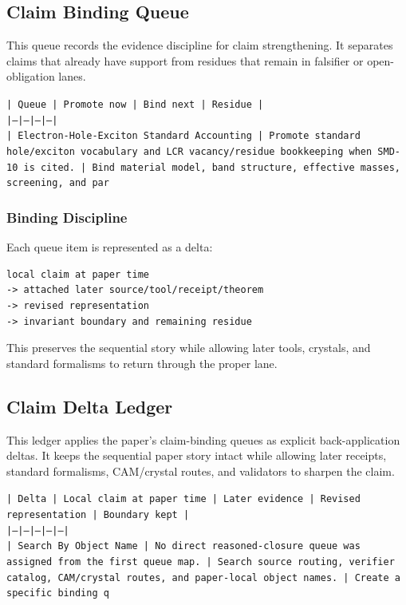 \documentclass[11pt]{article}
\begin{document}
\subsection*{Claim Binding Queue}

This queue records the evidence discipline for claim strengthening. It separates claims that already have support from residues that remain in falsifier or open-obligation lanes.

\noindent\texttt{| Queue | Promote now | Bind next | Residue |}\\
\noindent\texttt{|---|---|---|---|}\\
\noindent\texttt{| Electron-Hole-Exciton Standard Accounting | Promote standard hole/exciton vocabulary and LCR vacancy/residue bookkeeping when SMD-10 is cited. | Bind material model, band structure, effective masses, screening, and par}\\

\subsubsection*{Binding Discipline}

Each queue item is represented as a delta:

\begin{verbatim}
local claim at paper time
-> attached later source/tool/receipt/theorem
-> revised representation
-> invariant boundary and remaining residue
\end{verbatim}

This preserves the sequential story while allowing later tools, crystals, and
standard formalisms to return through the proper lane.

\subsection*{Claim Delta Ledger}

This ledger applies the paper's claim-binding queues as explicit back-application
deltas. It keeps the sequential paper story intact while allowing later
receipts, standard formalisms, CAM/crystal routes, and validators to sharpen the
claim.

\noindent\texttt{| Delta | Local claim at paper time | Later evidence | Revised representation | Boundary kept |}\\
\noindent\texttt{|---|---|---|---|---|}\\
\noindent\texttt{| Search By Object Name | No direct reasoned-closure queue was assigned from the first queue map. | Search source routing, verifier catalog, CAM/crystal routes, and paper-local object names. | Create a specific binding q}\\
\end{document}
